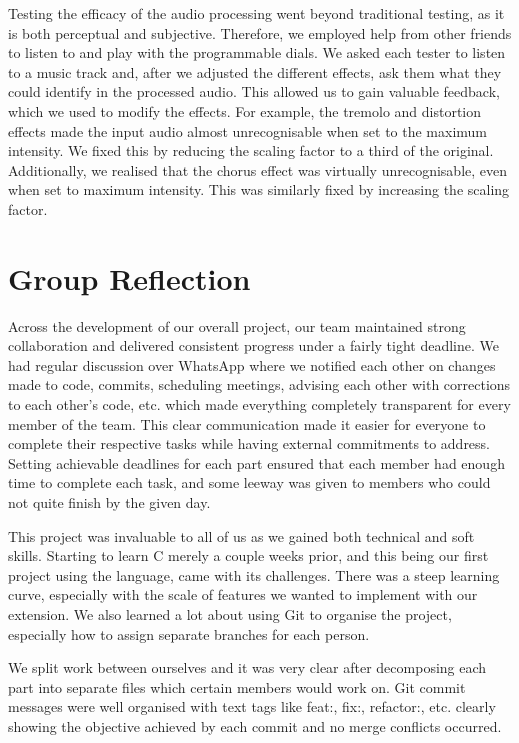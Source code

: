 \documentclass{article}
\begin{document}
Testing the efficacy of the audio processing went beyond traditional testing, as it is both perceptual and subjective. Therefore, we employed help from other friends to listen to and play with the programmable dials. We asked each tester to listen to a music track and, after we adjusted the different effects, ask them what they could identify in the processed audio. This allowed us to gain valuable feedback, which we used to modify the effects. For example, the tremolo and distortion effects made the input audio almost unrecognisable when set to the maximum intensity. We fixed this by reducing the scaling factor to a third of the original. Additionally, we realised that the chorus effect was virtually unrecognisable, even when set to maximum intensity. This was similarly fixed by increasing the scaling factor. 


\section{Group Reflection}

Across the development of our overall project, our team maintained strong collaboration and delivered consistent progress under a fairly tight deadline. We had regular discussion over WhatsApp where we notified each other on changes made to code, commits, scheduling meetings, advising each other with corrections to each other’s code, etc. which made everything completely transparent for every member of the team. This clear communication made it easier for everyone to complete their respective tasks while having external commitments to address. Setting achievable deadlines for each part ensured that each member had enough time to complete each task, and some leeway was given to members who could not quite finish by the given day. 


This project was invaluable to all of us as we gained both technical and soft skills. Starting to learn C merely a couple weeks prior, and this being our first project using the language, came with its challenges. There was a steep learning curve, especially with the scale of features we wanted to implement with our extension. We also learned a lot about using Git to organise the project, especially how to assign separate branches for each person.

We split work between ourselves and it was very clear after decomposing each part into separate files which certain members would work on. Git commit messages were well organised with text tags like feat:, fix:, refactor:, etc. clearly showing the objective achieved by each commit and no merge conflicts occurred.
\end{document}
